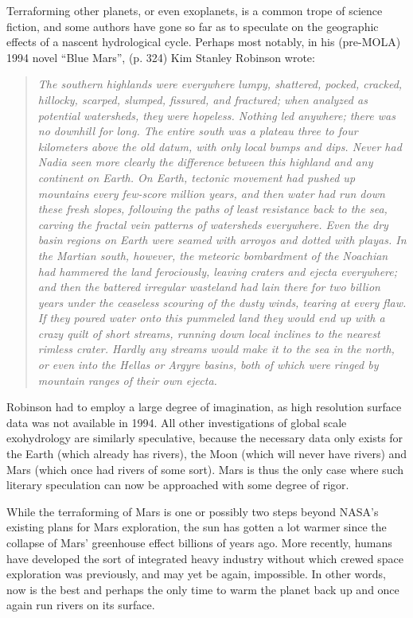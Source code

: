 \documentclass[12pt]{iopart}
\numberwithin{equation}{section}
\begin{document}
Terraforming other planets, or even exoplanets, is a common trope of science fiction, and some authors have gone so far as to speculate on the geographic effects of a nascent hydrological cycle. Perhaps most notably, in his (pre-MOLA) 1994 novel ``Blue Mars'', (p. 324) Kim Stanley Robinson wrote:

\begin{quote}
\small
\it{The southern highlands were everywhere lumpy, shattered, pocked, cracked, hillocky, scarped, slumped, fissured, and fractured; when analyzed as potential watersheds, they were hopeless. Nothing led anywhere; there was no downhill for long. The entire south was a plateau three to four kilometers above the old datum, with only local bumps and dips. Never had Nadia seen more clearly the difference between this highland and any continent on Earth. On Earth, tectonic movement had pushed up mountains every few-score million years, and then water had run down these fresh slopes, following the paths of least resistance back to the sea, carving the fractal vein patterns of watersheds everywhere. Even the dry basin regions on Earth were seamed with arroyos and dotted with playas. In the Martian south, however, the meteoric bombardment of the Noachian had hammered the land ferociously, leaving craters and ejecta everywhere; and then the battered irregular wasteland had lain there for two billion years under the ceaseless scouring of the dusty winds, tearing at every flaw. If they poured water onto this pummeled land they would end up with a crazy quilt of short streams, running down local inclines to the nearest rimless crater. Hardly any streams would make it to the sea in the north, or even into the Hellas or Argyre basins, both of which were ringed by mountain ranges of their own ejecta.}
\end{quote}

Robinson had to employ a large degree of imagination, as high resolution surface data was not available in 1994. All other investigations of global scale exohydrology are similarly speculative, because the necessary data only exists for the Earth (which already has rivers), the Moon (which will never have rivers) and Mars (which once had rivers of some sort). Mars is thus the only case where such literary speculation can now be approached with some degree of rigor.

While the terraforming of Mars is one or possibly two steps beyond NASA's existing plans for Mars exploration, the sun has gotten a lot warmer since the collapse of Mars' greenhouse effect billions of years ago\cite{sunwarmer}. More recently, humans have developed the sort of integrated heavy industry without which crewed space exploration was previously, and may yet be again, impossible. In other words, now is the best and perhaps the only time to warm the planet back up and once again run rivers on its surface.
\end{document}
